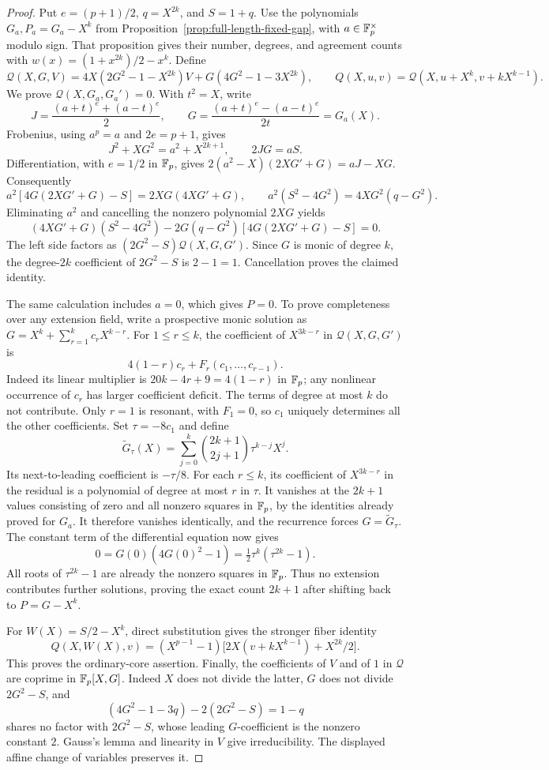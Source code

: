 \begin{proof}
Put $e=(p+1)/2$, $q=X^{2k}$, and $S=1+q$.  Use the polynomials
$G_a,P_a=G_a-X^k$ from Proposition~\ref{prop:full-length-fixed-gap},
with $a\in\mathbb F_p^\times$ modulo sign.  That proposition gives their
number, degrees, and agreement counts with
$w(x)=(1+x^{2k})/2-x^k$.  Define
\[
 \mathcal Q(X,G,V)
 =4X(2G^2-1-X^{2k})V+G(4G^2-1-3X^{2k}),
 \qquad
 Q(X,u,v)=\mathcal Q(X,u+X^k,v+kX^{k-1}).
\]
We prove $\mathcal Q(X,G_a,G_a')=0$.  With $t^2=X$, write
\[
 J=\frac{(a+t)^e+(a-t)^e}{2},\qquad
 G=\frac{(a+t)^e-(a-t)^e}{2t}=G_a(X).
\]
Frobenius, using $a^p=a$ and $2e=p+1$, gives
\[
 J^2+XG^2=a^2+X^{2k+1},\qquad 2JG=aS.
\]
Differentiation, with $e=1/2$ in $\mathbb F_p$, gives
$2(a^2-X)(2XG'+G)=aJ-XG$.  Consequently
\[
 a^2[4G(2XG'+G)-S]=2XG(4XG'+G),\qquad
 a^2(S^2-4G^2)=4XG^2(q-G^2).
\]
Eliminating $a^2$ and cancelling the nonzero polynomial $2XG$ yields
\[
 (4XG'+G)(S^2-4G^2)
 -2G(q-G^2)[4G(2XG'+G)-S]=0.
\]
The left side factors as
$(2G^2-S)\mathcal Q(X,G,G')$.
Since $G$ is monic of degree $k$, the degree-$2k$ coefficient of
$2G^2-S$ is $2-1=1$.  Cancellation proves the claimed identity.

The same calculation includes $a=0$, which gives $P=0$.
To prove completeness over any extension field, write a prospective
monic solution as $G=X^k+\sum_{r=1}^k c_rX^{k-r}$.
For $1\le r\le k$, the coefficient of $X^{3k-r}$ in
$\mathcal Q(X,G,G')$ is
\[
 4(1-r)c_r+F_r(c_1,\ldots,c_{r-1}).
\]
Indeed its linear multiplier is $20k-4r+9=4(1-r)$ in $\mathbb F_p$;
any nonlinear occurrence of $c_r$ has larger coefficient deficit.
The terms of degree at most $k$ do not contribute.
Only $r=1$ is resonant, with $F_1=0$, so $c_1$ uniquely determines
all the other coefficients.  Set $\tau=-8c_1$ and define
\[
 \widetilde G_\tau(X)
 =\sum_{j=0}^k\binom{2k+1}{2j+1}\tau^{k-j}X^j.
\]
Its next-to-leading coefficient is $-\tau/8$.
For each $r\le k$, its coefficient of $X^{3k-r}$ in the residual
is a polynomial of degree at most $r$ in $\tau$.
It vanishes at the $2k+1$ values consisting of zero and all nonzero
squares in $\mathbb F_p$, by the identities already proved for $G_a$.
It therefore vanishes identically, and the recurrence forces
$G=\widetilde G_\tau$.
The constant term of the differential equation now gives
\[
 0=G(0)(4G(0)^2-1)
   =\tfrac12\tau^k(\tau^{2k}-1).
\]
All roots of $\tau^{2k}-1$ are already the nonzero squares in $\mathbb F_p$.
Thus no extension contributes further solutions, proving the exact
count $2k+1$ after shifting back to $P=G-X^k$.

For $W(X)=S/2-X^k$, direct substitution gives the stronger fiber identity
\[
 Q(X,W(X),v)
 =(X^{p-1}-1)\bigl[2X(v+kX^{k-1})+X^{2k}/2\bigr].
\]
This proves the ordinary-core assertion.  Finally, the coefficients of
$V$ and of $1$ in $\mathcal Q$ are coprime in $\mathbb F_p[X,G]$.
Indeed $X$ does not divide the latter, $G$ does not divide $2G^2-S$,
and
\[
 (4G^2-1-3q)-2(2G^2-S)=1-q
\]
shares no factor with $2G^2-S$, whose leading $G$-coefficient is the
nonzero constant $2$.  Gauss's lemma and linearity in $V$ give
irreducibility.  The displayed affine change of variables preserves it.
\end{proof}


